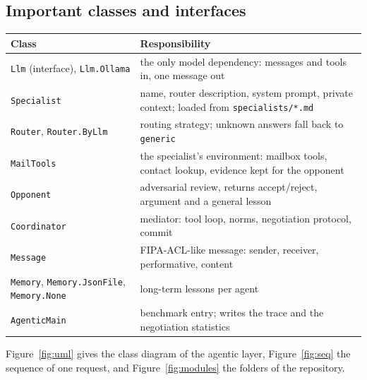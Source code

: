 \documentclass[11pt,a4paper]{article}
\newcommand{\code}[1]{\texttt{#1}}
\begin{document}
\subsection{Important classes and interfaces}
\begin{center}
\begin{tabularx}{\linewidth}{lX}
\toprule
Class & Responsibility \\
\midrule
\code{Llm} (interface), \code{Llm.Ollama} & the only model dependency: messages and tools in, one message out \\
\code{Specialist} & name, router description, system prompt, private context; loaded from \code{specialists/*.md} \\
\code{Router}, \code{Router.ByLlm} & routing strategy; unknown answers fall back to \code{generic} \\
\code{MailTools} & the specialist's environment: mailbox tools, contact lookup, evidence kept for the opponent \\
\code{Opponent} & adversarial review, returns accept/reject, argument and a general lesson \\
\code{Coordinator} & mediator: tool loop, norms, negotiation protocol, commit \\
\code{Message} & FIPA-ACL-like message: sender, receiver, performative, content \\
\code{Memory}, \code{Memory.JsonFile}, \code{Memory.None} & long-term lessons per agent \\
\code{AgenticMain} & benchmark entry; writes the trace and the negotiation statistics \\
\bottomrule
\end{tabularx}
\end{center}
Figure~\ref{fig:uml} gives the class diagram of the agentic layer, Figure~\ref{fig:seq} the sequence of one request,
and Figure~\ref{fig:modules} the folders of the repository.
\end{document}
